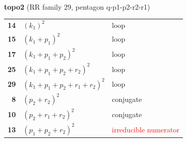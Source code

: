 \documentclass[10pt]{article}
\begin{document}
\begin{minipage}[t]{0.48\textwidth}
{}\\[2mm]\textbf{topo2} (RR family 29, pentagon q-p1-p2-r2-r1)\\[2pt]{\footnotesize\begin{tabular}{@{}r@{\ \ }l@{\ \ }l@{}}\textbf{14} & $(k_1)^2$ & loop\\
\textbf{15} & $(k_1+p_1)^2$ & loop\\
\textbf{17} & $(k_1+p_1+p_2)^2$ & loop\\
\textbf{25} & $(k_1+p_1+p_2+r_2)^2$ & loop\\
\textbf{29} & $(k_1+p_1+p_2+r_1+r_2)^2$ & loop\\
\textbf{8} & $(p_2+r_2)^2$ & conjugate\\
\textbf{10} & $(p_2+r_1+r_2)^2$ & conjugate\\
\textbf{13} & $(p_1+p_2+r_2)^2$ & \textcolor{red}{irreducible numerator}\\\end{tabular}}\end{minipage}

\bigskip
\end{document}
